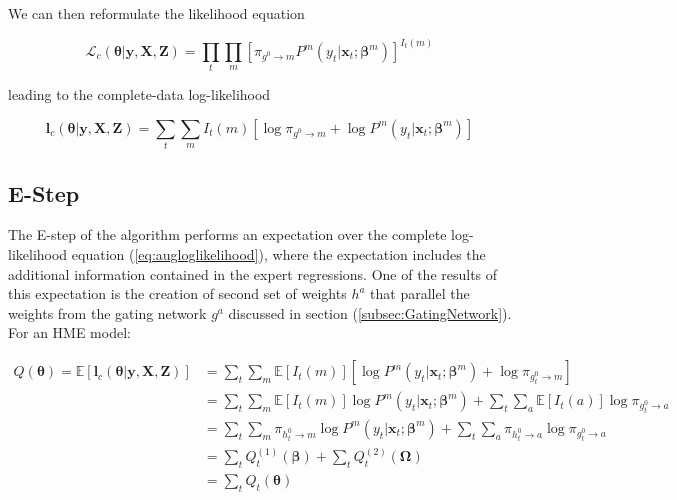 \documentclass[12pt]{article}
\newcommand{\EIm}[1]{\mathbb{E} \left[ I_{t}(#1) \right]}
\newcommand{\gateprod}[2]{\pi_{#1 \longrightarrow #2}}
\theoremstyle{definition}
\begin{document}
We can then reformulate the likelihood equation

\begin{equation}  \label{eq:auglikelihood}
  \mathcal{L}_{c}(\boldsymbol{\theta}| \boldsymbol{y}, \boldsymbol{X}, \boldsymbol{Z}) = \prod_{t} \prod_{m} \left[ \gateprod{g^{0}}{m}  P^{m}(y_{t}| \boldsymbol{x}_{t}; \boldsymbol{\beta}^{m}) \right]^{I_{t}(m)}
\end{equation}

leading to the complete-data log-likelihood

\begin{equation}  \label{eq:augloglikelihood}
  \boldsymbol{l}_{c}(\boldsymbol{\theta}| \boldsymbol{y}, \boldsymbol{X}, \boldsymbol{Z}) = \sum_{t} \sum_{m} I_{t}(m) \left[\log \gateprod{g^{0}}{m} + \log P^{m}(y_{t}| \boldsymbol{x}_{t}; \boldsymbol{\beta}^{m}) \right]
\end{equation}


\subsection{E-Step} \label{sec:Estep}
The E-step of the algorithm performs an expectation over the complete
log-likelihood equation (\ref{eq:augloglikelihood}), where the expectation
includes the additional information contained in the expert regressions.
One of the results of this expectation is the creation of second set of
weights $h^{a}$ that parallel the weights from the gating network $g^{a}$
discussed in section (\ref{subsec:GatingNetwork}). For an HME model:

\begin{equation} \label{eq:Estep}
  \begin{split}
  Q(\boldsymbol{\theta}) = \mathbb{E} \left [ \boldsymbol{l}_{c}(\boldsymbol{\theta}| \boldsymbol{y}, \boldsymbol{X}, \boldsymbol{Z}) \right] & = \sum_{t}\sum_{m} \EIm{m} \left[ \log P^{m}(y_{t}| \boldsymbol{x}_{t}; \boldsymbol{\beta}^{m}) + \log \gateprod{g^{0}_{t}}{m} \right] \\ 
   & = \sum_{t} \sum_{m} \EIm{m}  \log P^{m}(y_{t}| \boldsymbol{x}_{t}; \boldsymbol{\beta}^{m})   +       \sum_{t} \sum_{a} \mathbb{E} \left[ I_{t}(a) \right] \log \gateprod{g^{0}_{t}}{a} \\
   & = \sum_{t} \sum_{m} \gateprod{h^{0}_{t}}{m}  \log P^{m}(y_{t}| \boldsymbol{x}_{t}; \boldsymbol{\beta}^{m})   +       \sum_{t} \sum_{a} \gateprod{h^{0}_{t}}{a} \log \gateprod{g^{0}_{t}}{a} \\
   & = \sum_{t} Q^{(1)}_{t} (\boldsymbol{\beta}) + \sum_{t} Q^{(2)}_{t} (\boldsymbol{\Omega}) \\
   & = \sum_{t} Q_{t}(\boldsymbol{\theta})
 \end{split}
\end{equation}
\end{document}
